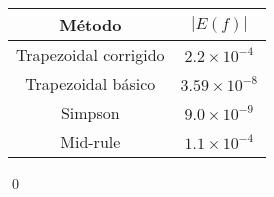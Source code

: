 \documentclass[11pt]{amsart}
\begin{document}
\bigskip
\begin{center}
    \begin{tabular}{c|c}
        \hline
        Método & $|E(f)|$ \\
        \hline
        Trapezoidal corrigido & $2.2 \times 10^{-4}$\\
        Trapezoidal básico & $3.59 \times 10^{-8}$ \\
        Simpson & $9.0 \times 10^{-9}$ \\
        Mid-rule & $1.1 \times 10^{-4}$ \\
        \hline
    \end{tabular}
\end{center}
\qed\null
\end{document}
